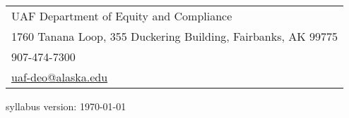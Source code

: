 \documentclass[12pt]{article}
\def\mailto#1{\href{mailto:#1}{#1}}
\begin{document}
\begin{tabular}{l}
UAF Department of Equity and Compliance\\
1760 Tanana Loop, 355 Duckering Building, Fairbanks, AK  99775\\
907-474-7300\\
\mailto{uaf-deo@alaska.edu}
\end{tabular}

 \scriptsize syllabus version: \today \normalsize
\end{document}
